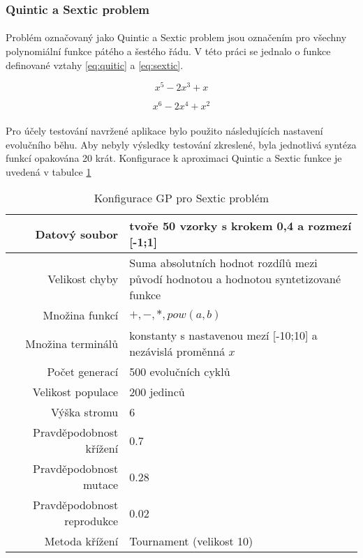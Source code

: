 \documentclass[bc,male,java,dept460]{diploma}		%
\begin{document}
\subsubsection{Quintic a Sextic problem}
\paragraph*{}
Problém označovaný jako Quintic a Sextic problem jsou označením pro všechny polynomiální funkce pátého a šestého řádu. V této práci se jednalo o funkce definované vztahy \ref{eq:quitic} a \ref{eq:sextic}.

\begin{equation} \label{eq:quitic}
x^5-2x^3+x
\end{equation}

\begin{equation} \label{eq:sextic}
x^6-2x^4+x^2
\end{equation}

\paragraph*{}
Pro účely testování navržené aplikace bylo použito následujících nastavení evolučního běhu. Aby nebyly výsledky testování zkreslené, byla jednotlivá syntéza funkcí opakována 20 krát. Konfigurace k aproximaci Quintic a Sextic funkce je uvedená v tabulce \ref{tab:QuinticSexticConf} 

\begin{table}
  \centering
  \begin{tabular}{| r | p{9cm} |} \hline
    Datový soubor & tvoře 50 vzorky s krokem 0,4 a rozmezí [-1;1] \\ \hline
    Velikost chyby & Suma absolutních hodnot rozdílů mezi původí hodnotou a hodnotou syntetizované funkce \\ \hline
    Množina funkcí & $+, -, *, pow(a,b)$ \\ \hline
    Množina terminálů & konstanty s nastavenou mezí [-10;10] a nezávislá proměnná $x$ \\ \hline
    Počet generací & 500 evolučních cyklů \\ \hline
    Velikost populace & 200 jedinců \\ \hline
    Výška stromu & 6 \\ \hline
    Pravděpodobnost křížení & 0.7 \\ \hline
    Pravděpodobnost mutace & 0.28 \\ \hline
    Pravděpodobnost reprodukce & 0.02 \\ \hline
    Metoda křížení & Tournament (velikost 10) \\ \hline
  \end{tabular}
  \label{tab:QuinticSexticConf}
  \caption{Konfigurace GP pro Sextic problém}
\end{table}
\end{document}
